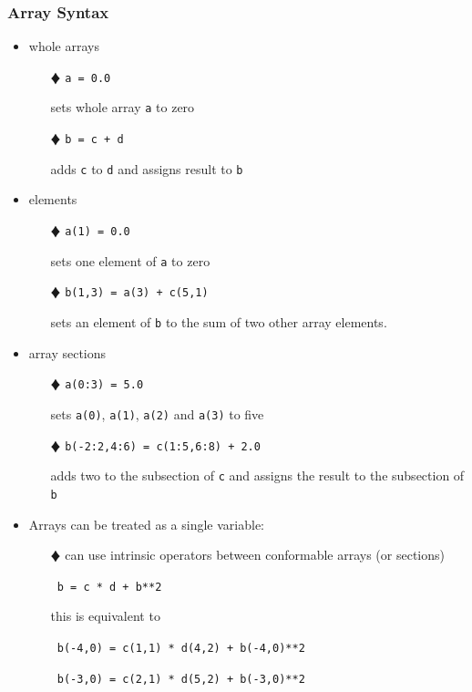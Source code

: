 \documentclass[slidestop,mathserif,compress,xcolor=svgnames]{beamer}
\begin{document}
\begin{frame}[allowframebreaks]
  \frametitle{\small Array Syntax}
  \begin{itemize}
    \item whole arrays
    \begin{enumerate}
      \item[$\vardiamond$] \texttt{a = 0.0}
      \item[] sets whole array \texttt{a} to zero
      \item[$\vardiamond$] \texttt{b = c + d}
      \item[] adds \texttt{c} to \texttt{d} and assigns result to \texttt{b}
    \end{enumerate}
    \item elements
    \begin{enumerate}
      \item[$\vardiamond$] \texttt{a(1) = 0.0}
      \item[] sets one element of \texttt{a} to zero
      \item[$\vardiamond$] \texttt{b(1,3) = a(3) + c(5,1)}
      \item[] sets an element of \texttt{b} to the sum of two other array elements.
    \end{enumerate}
    \item array sections
    \begin{enumerate}
      \item[$\vardiamond$] {\texttt{a(0:3) = 5.0}}
      \item[] sets {\texttt{a(0)}}, {\texttt{a(1)}}, {\texttt{a(2)}} and {\texttt{a(3)}} to five
      \item[$\vardiamond$] {\texttt{b(-2:2,4:6) = c(1:5,6:8) + 2.0}}
      \item[] adds two to the subsection of {\texttt{c}} and assigns the result to the subsection of {\texttt{b}}
    \end{enumerate}
    \framebreak
    \item Arrays can be treated as a single variable:
    \begin{enumerate}
      \item[$\vardiamond$] can use intrinsic operators between conformable arrays (or sections)
      \item[] {\texttt{ b = c * d + b**2 }}
      \item[] this is equivalent to
      \item[] {\texttt{ b(-4,0) = c(1,1) * d(4,2) + b(-4,0)**2 }}
      \item[] {\texttt{ b(-3,0) = c(2,1) * d(5,2) + b(-3,0)**2 }}

\end{enumerate}
\end{itemize}
\end{frame}
\end{document}
